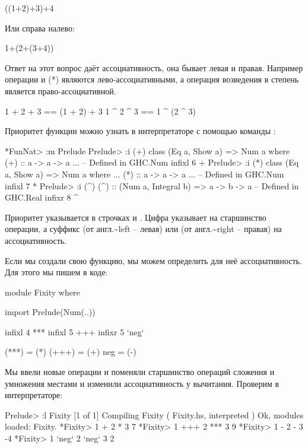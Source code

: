 \begin{code}
((1+2)+3)+4
\end{code}

Или справа налево:


\begin{code}
1+(2+(3+4))
\end{code}

Ответ на этот вопрос даёт ассоциативность, она бывает левая и правая.
Например операции \In{(+)} \In{(-)} и (*) являются лево-ассоциативными,
а операция возведения в степень \In{(^)} является право-ассоциативной.


\begin{code}
1 + 2 + 3 == (1 + 2) + 3
1 ^ 2 ^ 3 ==  1 ^ (2 ^ 3)
\end{code}

Приоритет функции можно узнать в интерпретаторе с помощью команды
:


\begin{code}
*FunNat> :m Prelude
Prelude> :i (+)
class (Eq a, Show a) => Num a where
  (+) :: a -> a -> a
  ...
  	-- Defined in GHC.Num
infixl 6 +
Prelude> :i (*)
class (Eq a, Show a) => Num a where
  ...
  (*) :: a -> a -> a
  ...
  	-- Defined in GHC.Num
infixl 7 *
Prelude> :i (^)
(^) :: (Num a, Integral b) => a -> b -> a 	-- Defined in GHC.Real
infixr 8 ^
\end{code}

Приоритет указывается в строчках  и .
Цифра указывает на старшинство операции, а суффикс  (от
англ.\textasciitilde{}left -- левая) или  (от
англ.\textasciitilde{}right -- правая) на ассоциативность.

Если мы создали свою функцию, мы можем определить для неё
ассоциативность. Для этого мы пишем в коде:


\begin{code}
module Fixity where

import Prelude(Num(..))

infixl 4 *** 
infixl 5 +++
infixr 5 `neg`

(***) = (*)
(+++) = (+)
neg   = (-)
\end{code}

Мы ввели новые операции и поменяли старшинство операций сложения и
умножения местами и изменили ассоциативность у вычитания. Проверим в
интерпретаторе:


\begin{code}
Prelude> :l Fixity
[1 of 1] Compiling Fixity           ( Fixity.hs, interpreted )
Ok, modules loaded: Fixity.
*Fixity> 1 + 2 * 3
7
*Fixity> 1 +++ 2 *** 3
9
*Fixity> 1 - 2 - 3
-4
*Fixity> 1 `neg` 2 `neg` 3
2
\end{code}

